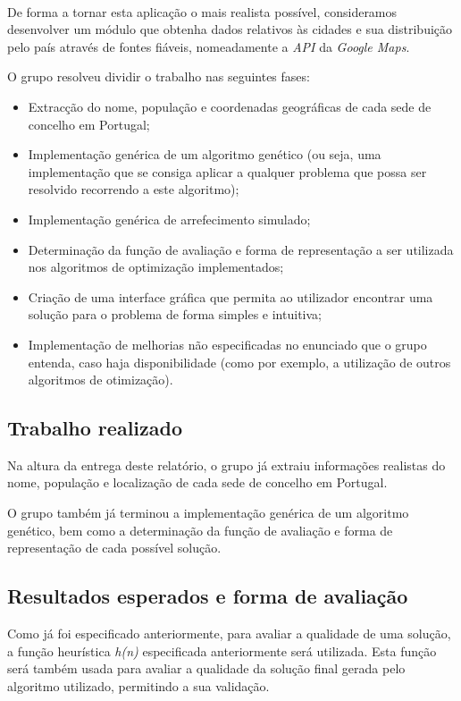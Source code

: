 \documentclass[11pt,a4paper,reqno]{article}
\numberwithin{equation}{section}
\begin{document}
\ 

De forma a tornar esta aplicação o mais realista possível, consideramos desenvolver um módulo que obtenha dados relativos às cidades e sua distribuição pelo país através de fontes fiáveis, nomeadamente a \textit{API} da \textit{Google Maps}. 

O grupo resolveu dividir o trabalho nas seguintes fases:
\begin{itemize}
\item Extracção do nome, população e coordenadas geográficas de cada sede de concelho em Portugal;
\item Implementação genérica de um algoritmo genético (ou seja, uma implementação que se consiga aplicar a qualquer problema que possa ser resolvido recorrendo a este algoritmo);
\item Implementação genérica de arrefecimento simulado;
\item Determinação da função de avaliação e forma de representação a ser utilizada nos algoritmos de optimização implementados;
\item Criação de uma interface gráfica que permita ao utilizador encontrar uma solução para o problema de forma simples e intuitiva;
\item Implementação de melhorias não especificadas no enunciado que o grupo entenda, caso haja disponibilidade (como por exemplo, a utilização de outros algoritmos de otimização).
\end{itemize}


\subsection{Trabalho realizado}
Na altura da entrega deste relatório, o grupo já extraiu informações realistas do nome, população e localização de cada sede de concelho em Portugal.

O grupo também já terminou a implementação genérica de um algoritmo genético, bem como a determinação da função de avaliação e forma de representação de cada possível solução.

\subsection{Resultados esperados e forma de avaliação}
Como já foi especificado anteriormente, para avaliar a qualidade de uma solução, a função heurística \textit{h(n)} especificada anteriormente será utilizada. Esta função será também usada para avaliar a qualidade da solução final gerada pelo algoritmo utilizado, permitindo a sua validação.
\end{document}
